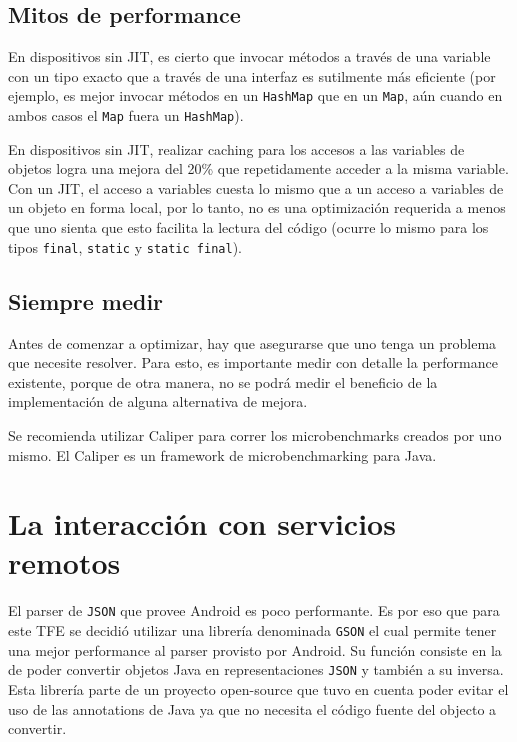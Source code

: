 \subsection{Mitos de performance}
\label{subsec:dev.perf.myths}

En dispositivos sin \ac{JIT}, es cierto que invocar m\'etodos a trav\'es de una variable con un tipo exacto que a trav\'es de una interfaz es sutilmente m\'as eficiente (por ejemplo, es mejor invocar m\'etodos en un \texttt{HashMap} que en un \texttt{Map}, a\'un cuando en ambos casos el \texttt{Map} fuera un \texttt{HashMap}). 

En dispositivos sin \ac{JIT}, realizar caching para los accesos a las variables de objetos logra una mejora del 20\% que repetidamente acceder a la misma variable. Con un \ac{JIT}, el acceso a variables cuesta lo mismo que a un acceso a variables de un objeto en forma local, por lo tanto, no es una optimizaci\'on requerida a menos que uno sienta que esto facilita la lectura del c\'odigo (ocurre lo mismo para los tipos \texttt{final}, \texttt{static} y \texttt{static final}).

\subsection{Siempre medir}
\label{subsec:dev.perf.measure.always}

Antes de comenzar a optimizar, hay que asegurarse que uno tenga un problema que necesite resolver. Para esto, es importante medir con detalle la performance existente, porque de otra manera, no se podr\'a medir el beneficio de la implementaci\'on de alguna alternativa de mejora.

Se recomienda utilizar Caliper para correr los microbenchmarks creados por uno mismo. El Caliper es un framework de microbenchmarking para Java.

\section{La interacción con servicios remotos}
\label{sec:remote.services}

El parser de \texttt{JSON} que provee Android es poco performante. Es por eso que para este \ac{TFE} se decidi\'o utilizar una librer\'ia denominada \texttt{GSON} el cual permite tener una mejor performance al parser provisto por Android. Su funci\'on consiste en la de poder convertir objetos Java en representaciones \texttt{JSON} y tambi\'en a su inversa. Esta librer\'ia parte de un proyecto open-source que tuvo en cuenta poder evitar el uso de las annotations de Java ya que no necesita el c\'odigo fuente del objecto a convertir\cite{gson}.

